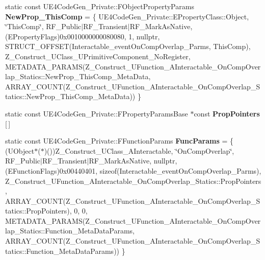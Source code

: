 \begin{DoxyCompactItemize}
\item 
\mbox{\label{struct_z___construct___u_function___a_interactable___on_comp_overlap___statics_afed192afe7c0107befcc08f3864bb5d3}} 
static const U\+E4\+Code\+Gen\+\_\+\+Private\+::\+F\+Object\+Property\+Params {\bfseries New\+Prop\+\_\+\+This\+Comp} = \{ U\+E4\+Code\+Gen\+\_\+\+Private\+::\+E\+Property\+Class\+::\+Object, \char`\"{}This\+Comp\char`\"{}, R\+F\+\_\+\+Public$\vert$R\+F\+\_\+\+Transient$\vert$R\+F\+\_\+\+Mark\+As\+Native, (E\+Property\+Flags)0x0010000000080080, 1, nullptr, S\+T\+R\+U\+C\+T\+\_\+\+O\+F\+F\+S\+E\+T(\+Interactable\+\_\+event\+On\+Comp\+Overlap\+\_\+\+Parms, This\+Comp), Z\+\_\+\+Construct\+\_\+\+U\+Class\+\_\+\+U\+Primitive\+Component\+\_\+\+No\+Register, M\+E\+T\+A\+D\+A\+T\+A\+\_\+\+P\+A\+R\+A\+M\+S(\+Z\+\_\+\+Construct\+\_\+\+U\+Function\+\_\+\+A\+Interactable\+\_\+\+On\+Comp\+Overlap\+\_\+\+Statics\+::\+New\+Prop\+\_\+\+This\+Comp\+\_\+\+Meta\+Data, A\+R\+R\+A\+Y\+\_\+\+C\+O\+U\+N\+T(\+Z\+\_\+\+Construct\+\_\+\+U\+Function\+\_\+\+A\+Interactable\+\_\+\+On\+Comp\+Overlap\+\_\+\+Statics\+::\+New\+Prop\+\_\+\+This\+Comp\+\_\+\+Meta\+Data)) \}
\item 
static const U\+E4\+Code\+Gen\+\_\+\+Private\+::\+F\+Property\+Params\+Base $\ast$const {\bfseries Prop\+Pointers} \mbox{[}$\,$\mbox{]}
\item 
\mbox{\label{struct_z___construct___u_function___a_interactable___on_comp_overlap___statics_af06b57960d9997e93cb91e21e0a9c5a8}} 
static const U\+E4\+Code\+Gen\+\_\+\+Private\+::\+F\+Function\+Params {\bfseries Func\+Params} = \{ (U\+Object$\ast$($\ast$)())Z\+\_\+\+Construct\+\_\+\+U\+Class\+\_\+\+A\+Interactable, \char`\"{}On\+Comp\+Overlap\char`\"{}, R\+F\+\_\+\+Public$\vert$R\+F\+\_\+\+Transient$\vert$R\+F\+\_\+\+Mark\+As\+Native, nullptr, (E\+Function\+Flags)0x00440401, sizeof(\+Interactable\+\_\+event\+On\+Comp\+Overlap\+\_\+\+Parms), Z\+\_\+\+Construct\+\_\+\+U\+Function\+\_\+\+A\+Interactable\+\_\+\+On\+Comp\+Overlap\+\_\+\+Statics\+::\+Prop\+Pointers, A\+R\+R\+A\+Y\+\_\+\+C\+O\+U\+N\+T(\+Z\+\_\+\+Construct\+\_\+\+U\+Function\+\_\+\+A\+Interactable\+\_\+\+On\+Comp\+Overlap\+\_\+\+Statics\+::\+Prop\+Pointers), 0, 0, M\+E\+T\+A\+D\+A\+T\+A\+\_\+\+P\+A\+R\+A\+M\+S(\+Z\+\_\+\+Construct\+\_\+\+U\+Function\+\_\+\+A\+Interactable\+\_\+\+On\+Comp\+Overlap\+\_\+\+Statics\+::\+Function\+\_\+\+Meta\+Data\+Params, A\+R\+R\+A\+Y\+\_\+\+C\+O\+U\+N\+T(\+Z\+\_\+\+Construct\+\_\+\+U\+Function\+\_\+\+A\+Interactable\+\_\+\+On\+Comp\+Overlap\+\_\+\+Statics\+::\+Function\+\_\+\+Meta\+Data\+Params)) \}
\end{DoxyCompactItemize}


